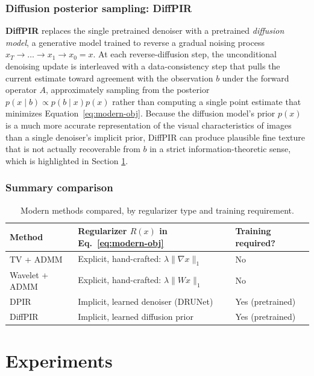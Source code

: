 \documentclass[12pt, a4paper, onecolumn]{article}
\theoremstyle{plain}          %
\theoremstyle{definition}     %
\theoremstyle{remark}
\begin{document}
\subsubsection{Diffusion posterior sampling: DiffPIR}

\textbf{DiffPIR} \cite{diffpir2023} replaces the single pretrained denoiser
with a pretrained \emph{diffusion model}, a generative model trained to
reverse a gradual noising process $x_T\to\dots\to x_1\to x_0=x$. At each
reverse-diffusion step, the unconditional denoising update is interleaved with a data-consistency step that pulls the current estimate toward agreement with the observation $b$ under the forward operator $A$,
approximately sampling from the posterior $p(x\mid b)\propto p(b\mid x)p(x)$
rather than computing a single point estimate that minimizes
Equation~\eqref{eq:modern-obj}. Because the diffusion model's prior $p(x)$
is a much more accurate representation of the visual characteristics of images than a single denoiser's implicit prior, DiffPIR can produce plausible fine texture that is not actually recoverable from $b$ in a strict information-theoretic sense, which is highlighted in Section \ref{sec:experiments}.

\subsubsection{Summary comparison}

\begin{table}[H]
\centering
\footnotesize
\begin{tabular}{p{3cm}p{5cm}p{4cm}}
\toprule
\textbf{Method} & \textbf{Regularizer} $R(x)$ in \textbf{Eq.~\eqref{eq:modern-obj}} & \textbf{Training required?} \\
\midrule
TV + ADMM & Explicit, hand-crafted: $\lambda\|\nabla x\|_1$ & No \\
Wavelet + ADMM & Explicit, hand-crafted: $\lambda\|Wx\|_1$ & No \\
DPIR & Implicit, learned denoiser (DRUNet) & Yes (pretrained) \\
DiffPIR & Implicit, learned diffusion prior & Yes (pretrained) \\
\bottomrule
\end{tabular}
\caption{Modern methods compared, by regularizer type and training
requirement.}
\label{tab:modern-methods}
\end{table}


\section{Experiments}
\label{sec:experiments}
\end{document}
